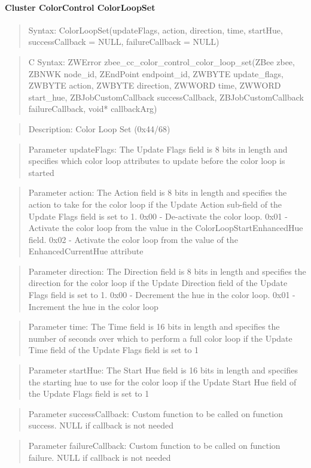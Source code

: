 \paragraph{Cluster ColorControl ColorLoopSet}
\begin{quote}Syntax: ColorLoopSet(updateFlags, action, direction, time, startHue, successCallback = NULL, failureCallback = NULL)\end{quote}
\begin{quote}C Syntax: ZWError zbee\_cc\_color\_control\_color\_loop\_set(ZBee zbee, ZBNWK node\_id, ZEndPoint endpoint\_id, ZWBYTE update\_flags, ZWBYTE action, ZWBYTE direction, ZWWORD time, ZWWORD start\_hue, ZBJobCustomCallback successCallback, ZBJobCustomCallback failureCallback, void* callbackArg)\end{quote}
\begin{quote}Description: Color Loop Set (0x44/68)\end{quote}
\begin{quote}Parameter updateFlags: The Update Flags field is 8 bits in length and specifies which color loop attributes to update before the color loop is started\end{quote}
\begin{quote}Parameter action: The Action field is 8 bits in length and specifies the action to take for the color loop if the Update Action sub-field of the Update Flags field is set to 1. 0x00 - De-activate the color loop. 0x01 - Activate the color loop from the value in the ColorLoopStartEnhancedHue field. 0x02 - Activate the color loop from the value of the EnhancedCurrentHue attribute\end{quote}
\begin{quote}Parameter direction: The Direction field is 8 bits in length and specifies the direction for the color loop if the Update Direction field of the Update Flags field is set to 1. 0x00 - Decrement the hue in the color loop. 0x01 - Increment the hue in the color loop\end{quote}
\begin{quote}Parameter time: The Time field is 16 bits in length and specifies the number of seconds over which to perform a full color loop if the Update Time field of the Update Flags field is set to 1\end{quote}
\begin{quote}Parameter startHue: The Start Hue field is 16 bits in length and specifies the starting hue to use for the color loop if the Update Start Hue field of the Update Flags field is set to 1\end{quote}
\begin{quote}Parameter successCallback: Custom function to be called on function success. NULL if callback is not needed\end{quote}
\begin{quote}Parameter failureCallback: Custom function to be called on function failure. NULL if callback is not needed\end{quote}


